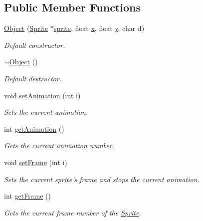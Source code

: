 \subsection*{Public Member Functions}
\begin{DoxyCompactItemize}
\item 
\hyperlink{class_object_a9e5569564089c40dbfa85703035ddaf2}{Object} (\hyperlink{class_sprite}{Sprite} $\ast$\hyperlink{class_object_ad936466f3f6b6e8fa401842c573b44e6}{sprite}, float \hyperlink{class_object_a99addca3b5d96c214fa8f90474224699}{x}, float \hyperlink{class_object_a2870044ec214e97550ee28db89c6382a}{y}, char d)
\begin{DoxyCompactList}\small\item\em Default constructor. \end{DoxyCompactList}\item 
\hyperlink{class_object_ae8f5483f459e46687bd01e6f9977afd3}{$\sim$\-Object} ()
\begin{DoxyCompactList}\small\item\em Default destructor. \end{DoxyCompactList}\item 
void \hyperlink{class_object_a182782f2325980f649409507c2970af8}{set\-Animation} (int i)
\begin{DoxyCompactList}\small\item\em Sets the current animation. \end{DoxyCompactList}\item 
int \hyperlink{class_object_ab58cde576bd8ae773fa742f147a792f2}{get\-Animation} ()
\begin{DoxyCompactList}\small\item\em Gets the current animation number. \end{DoxyCompactList}\item 
void \hyperlink{class_object_a21d5b472e193c2665cd06be4a9cc270d}{set\-Frame} (int i)
\begin{DoxyCompactList}\small\item\em Sets the current sprite's frame and stops the current animation. \end{DoxyCompactList}\item 
int \hyperlink{class_object_a2a1724269f3d7ebf7007d079312cb850}{get\-Frame} ()
\begin{DoxyCompactList}\small\item\em Gets the current frame number of the \hyperlink{class_sprite}{Sprite}. \end{DoxyCompactList}\item 

\end{DoxyCompactItemize}
